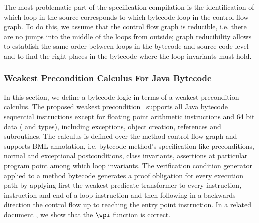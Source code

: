 \begin{enumerate}
\end{enumerate}

%
%
 The most problematic part of the specification compilation is the identification of
 which loop in the source corresponds to which bytecode loop in the control flow
 graph. To do this, we assume that the control flow graph is reducible, 
i.e. there are no jumps into the middle of the loops from outside; graph reducibility allows to establish the same order between loops in the
 bytecode and source code level and to find the right places in the bytecode where the loop invariants must hold.


\subsubsection{Weakest Precondition Calculus For Java
Bytecode}\label{wpbc} In this section, we define a bytecode logic in
terms of a weakest precondition calculus. The proposed weakest
precondition \wpi \ supports all Java bytecode sequential instructions
except for floating point arithmetic instructions and 64 bit data
( and  types), including exceptions, object
creation, references and subroutines. The calculus is defined over the
method control flow graph and supports BML annotation, i.e. bytecode
method's specification like preconditions, normal and exceptional
postconditions, class invariants, assertions at particular program
point among which loop invariants. The verification condition
generator applied to a method bytecode generates a proof obligation
for every execution path by applying first the weakest predicate
transformer to every  instruction, 
instruction and end of a loop instruction and then following in a
backwards direction the control flow up to reaching the entry point
instruction. In a related document \cite{JBL05MP}, we show that the
$\wpi$ function is correct.


